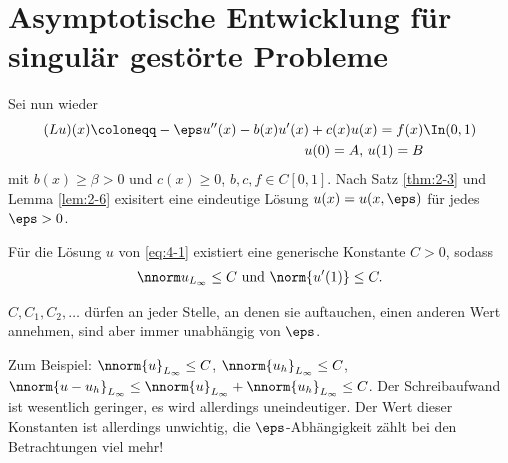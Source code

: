 
\section{Asymptotische Entwicklung für singulär gestörte Probleme}
\label{sec:asympt-entw-fur}

Sei nun wieder
\begin{align}\label{eq:4-1}
  (Lu)(x)\coloneqq - \eps u''(x) - b(x)u'(x) + c(x)u(x) = f(x) &\In (0, 1)\\
  u(0) = A, \, u(1) = B &\notag
\end{align}
mit $b(x)\geq \beta > 0$ und $c(x)\geq0$, $b, c, f \in C[0, 1]$. Nach Satz \ref{thm:2-3} und Lemma \ref{lem:2-6} exisitert eine eindeutige Lösung $u(x) = u(x, \eps)$ für jedes $\eps> 0$. 
\begin{lemma}\label{lem:4-1}
  Für die Lösung $u$ von \eqref{eq:4-1} existiert eine generische Konstante $C> 0$, sodass
  \begin{align*}
    \nnorm u_{L_{\infty}} \leq C \text{ und } \norm{u'(1)} \leq C. 
  \end{align*}
\end{lemma}
\begin{bemerkung*} $C, C_{1}, C_{2}, \dots$ dürfen an jeder Stelle, an denen sie auftauchen, einen anderen Wert annehmen, sind aber immer unabhängig von $\eps$.

  Zum Beispiel: $\nnorm{u}_{L_{\infty}} \leq C$, $\nnorm{u_{h}}_{L_{\infty}} \leq C$, $\nnorm{u - u_{h}}_{L_{\infty}} \leq \nnorm{u}_{L_{\infty}} + \nnorm{u_{h}}_{L_{\infty}}  \leq C$. Der Schreibaufwand ist wesentlich geringer, es wird allerdings uneindeutiger. Der Wert dieser Konstanten ist allerdings unwichtig, die $\eps$-Abhängigkeit zählt bei den Betrachtungen viel mehr! 
\end{bemerkung*}


